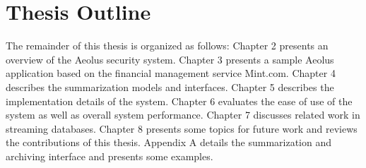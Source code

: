 



\section{Thesis Outline}

The remainder of this thesis is organized as follows: Chapter 2 presents an overview of the Aeolus security system. Chapter 3 presents a sample Aeolus application based on the financial management service Mint.com. Chapter 4 describes the summarization models and interfaces. Chapter 5 describes the implementation details of the system. Chapter 6 evaluates the ease of use of the system as well as overall system performance. Chapter 7 discusses related work in streaming databases. Chapter 8 presents some topics for future work and reviews the contributions of this thesis. Appendix A details the summarization and archiving interface and presents some examples.
